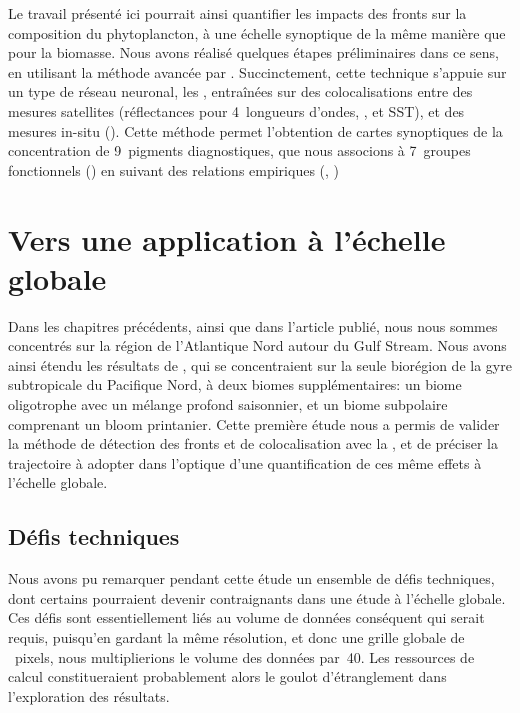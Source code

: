 Le travail présenté ici pourrait ainsi quantifier les impacts des fronts sur la composition du phytoplancton, à une échelle synoptique de la même manière que pour la biomasse.
Nous avons réalisé quelques étapes préliminaires dans ce sens, en utilisant la méthode avancée par \textcite{elhourany_2019,elhourany_2019a}.
Succinctement, cette technique s'appuie sur un type de réseau neuronal, les , entraînées sur des colocalisations entre des mesures satellites (réflectances pour 4~longueurs d'ondes, , et SST), et des mesures in-situ ().
Cette méthode permet l'obtention de cartes synoptiques de la concentration de 9~pigments diagnostiques, que nous associons à 7~groupes fonctionnels () en suivant des relations empiriques (, \cite{vidussi_2001,uitz_2006,brewin_2010,hirata_2011})

\section{Vers une application à l'échelle globale}
\label{sec:appl-globale}

Dans les chapitres précédents, ainsi que dans l'article publié, nous nous sommes concentrés sur la région de l'Atlantique Nord autour du Gulf Stream.
Nous avons ainsi étendu les résultats de \textcite{liu_2016}, qui se concentraient sur la seule biorégion de la gyre subtropicale du Pacifique Nord, à deux biomes supplémentaires: un biome oligotrophe avec un mélange profond saisonnier, et un biome subpolaire comprenant un bloom printanier.
Cette première étude nous a permis de valider la méthode de détection des fronts et de colocalisation avec la , et de préciser la trajectoire à adopter dans l'optique d'une quantification de ces même effets à l'échelle globale.

\subsection{Défis techniques}

Nous avons pu remarquer pendant cette étude un ensemble de défis techniques, dont certains pourraient devenir contraignants dans une étude à l'échelle globale.
Ces défis sont essentiellement liés au volume de données conséquent qui serait requis, puisqu'en gardant la même résolution, et donc une grille globale de ~pixels, nous multiplierions le volume des données par~40.
Les ressources de calcul constitueraient probablement alors le goulot d'étranglement dans l'exploration des résultats.

